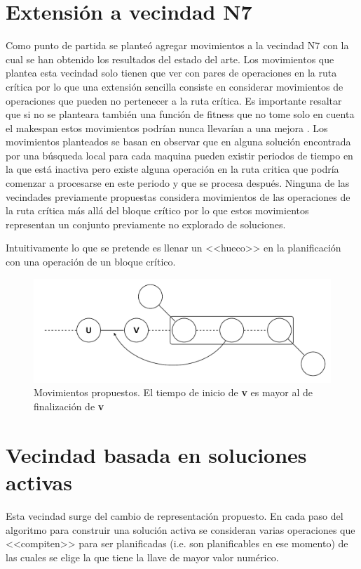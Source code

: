 \section{Extensión a vecindad N7}
Como punto de partida se planteó agregar movimientos a la vecindad N7 con la cual se han obtenido los resultados del estado del arte.
Los movimientos que plantea esta vecindad solo tienen que ver con pares de operaciones en la ruta crítica por lo que una extensión sencilla consiste en considerar movimientos de operaciones que pueden no pertenecer a la ruta crítica. Es importante resaltar que si no se planteara también una función de fitness que no tome solo en cuenta el makespan estos movimientos podrían nunca llevarían a una mejora \cite{blazewicz1996job}. 
Los movimientos planteados se basan en observar que en alguna solución encontrada por una búsqueda local para cada maquina pueden existir periodos de tiempo en la que está inactiva pero existe alguna operación en la ruta critica que podría comenzar a procesarse en este periodo y que se procesa después. Ninguna de las vecindades previamente propuestas considera movimientos de las operaciones de la ruta crítica más allá del bloque crítico por lo que estos movimientos representan un conjunto previamente no explorado de soluciones.

Intuitivamente lo que se pretende es llenar un <<hueco>> en la planificación con una operación de un bloque crítico.

\begin{figure}[H]
\centering
\includegraphics[scale=.7]{Imagenes/N8.pdf}
    \caption{Movimientos propuestos. El tiempo de inicio de \textbf{v} es mayor al de finalización de \textbf{v}}
\end{figure}

\section{Vecindad basada en soluciones activas}
Esta vecindad surge del cambio de representación propuesto. En cada paso del algoritmo para construir una solución activa se consideran varias operaciones que <<compiten>> para ser planificadas (i.e. son planificables en ese momento) de las cuales se elige la que tiene la llave de mayor valor numérico. 

